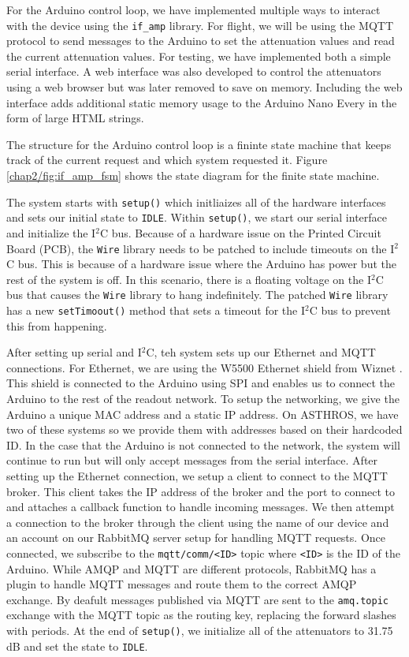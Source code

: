 For the Arduino control loop, we have implemented multiple ways to interact with the device using the \texttt{if\_amp} library.
For flight, we will be using the MQTT protocol to send messages to the Arduino to set the attenuation values and read the current attenuation values.
For testing, we have implemented both a simple serial interface. 
A web interface was also developed to control the attenuators using a web browser but was later removed to save on memory. 
Including the web interface adds additional static memory usage to the Arduino Nano Every in the form of large HTML strings.

The structure for the Arduino control loop is a fininte state machine that keeps track of the current request and which system requested it.
Figure \ref{chap2/fig:if_amp_fsm} shows the state diagram for the finite state machine.

The system starts with \texttt{setup()} which initliaizes all of the hardware interfaces and sets our initial state to \texttt{IDLE}.
Within \texttt{setup()}, we start our serial interface and initialize the I$^2$C bus.
Because of a hardware issue on the Printed Circuit Board (PCB), the \texttt{Wire} library needs to be patched to include timeouts on the I$^2$C bus.
This is because of a hardware issue where the Arduino has power but the rest of the system is off.
In this scenario, there is a floating voltage on the I$^2$C bus that causes the \texttt{Wire} library to hang indefinitely.
The patched \texttt{Wire} library has a new \texttt{setTimoout()} method that sets a timeout for the I$^2$C bus to prevent this from happening.

After setting up serial and I$^2$C, teh system sets up our Ethernet and MQTT connections.
For Ethernet, we are using the W5500 Ethernet shield from Wiznet \cite{w5500}.
This shield is connected to the Arduino using SPI and enables us to connect the Arduino to the rest of the readout network. 
To setup the networking, we give the Arduino a unique MAC address and a static IP address.
On ASTHROS, we have two of these systems so we provide them with addresses based on their hardcoded ID. 
In the case that the Arduino is not connected to the network, the system will continue to run but will only accept messages from the serial interface.
After setting up the Ethernet connection, we setup a client to connect to the MQTT broker.
This client takes the IP address of the broker and the port to connect to and attaches a callback function to handle incoming messages.
We then attempt a connection to the broker through the client using the name of our device and an account on our RabbitMQ server setup for handling MQTT requests.
Once connected, we subscribe to the \texttt{mqtt/comm/<ID>} topic where \texttt{<ID>} is the ID of the Arduino.
While AMQP and MQTT are different protocols, RabbitMQ has a plugin to handle MQTT messages and route them to the correct AMQP exchange.
By deafult messages published via MQTT are sent to the \texttt{amq.topic} exchange with the MQTT topic as the routing key, replacing the forward slashes with periods.
At the end of \texttt{setup()}, we initialize all of the attenuators to 31.75 dB and set the state to \texttt{IDLE}.

